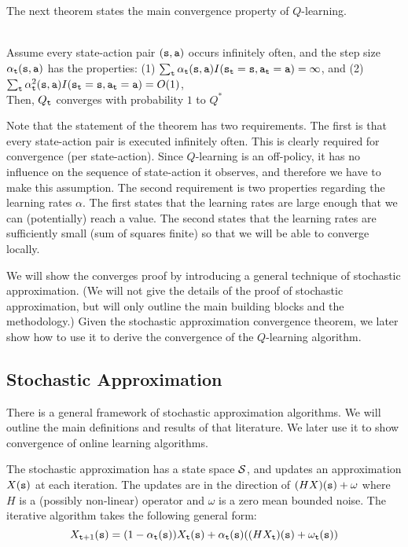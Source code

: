 The next theorem states the main convergence property of
$Q$-learning.
\begin{theorem}\ \\
\label{thm:Q-learning} Assume every state-action pair
$({\tt s},{\tt a})$ occurs infinitely often, and the step size
$\alpha_{\tt t}({\tt s},{\tt a})$ has the properties: (1) $\sum_{\tt t}
\alpha_{\tt t}({\tt s},{\tt a})
I({\tt s}_{\tt t}={\tt s},{\tt a}_{\tt t}={\tt a})=\infty $, and (2)
$\sum_{\tt t}
\alpha_{\tt t}^2({\tt s},{\tt a}) I({\tt s}_{\tt t}={\tt s},{\tt a}_{\tt t}={\tt a})=O(1)$,\\
Then, $Q_{\tt t}$ converges with probability $1$ to $Q^*$
\end{theorem}

Note that the statement of the theorem has two requirements. The
first is that every state-action pair is executed infinitely often.
This is clearly required for convergence (per state-action). Since
$Q$-learning is an off-policy, it has no influence on the sequence
of state-action it observes, and therefore we have to make this
assumption. The second requirement is two properties regarding the
learning rates $\alpha$. The first states that the learning rates
are large enough that we can (potentially) reach a value. The
second states that the learning rates are sufficiently small (sum of
squares finite) so that we will be able to converge locally.

We will show the converges proof by introducing a general technique
of stochastic approximation. (We will not give the details of the
proof of stochastic approximation, but will only outline the main
building blocks and the methodology.) Given the stochastic
approximation convergence theorem, we later show how to use it to
derive the convergence of the $Q$-learning algorithm.


\subsection{Stochastic Approximation}
\label{sec:stochastic-approximation}

There is a general framework of stochastic approximation algorithms.
We will outline the main definitions and results of that literature.
We later use it to show convergence of online learning algorithms.

The stochastic approximation has a state space $\mathcal{S}$, and
updates an approximation $X({\tt s})$ at each iteration. The updates
are in the direction of $(HX)({\tt s})+\omega$ where $H$ is a (possibly
non-linear) operator and $\omega$ is a zero mean bounded noise. The
iterative algorithm takes the following general form:
\[
X_{{\tt t}+1}({\tt s}) =
(1-\alpha_{\tt t}({\tt s}))X_{\tt t}({\tt s})+\alpha_{\tt t}({\tt s})((HX_{\tt t})({\tt s})+\omega_{\tt t}({\tt s}))
\]

